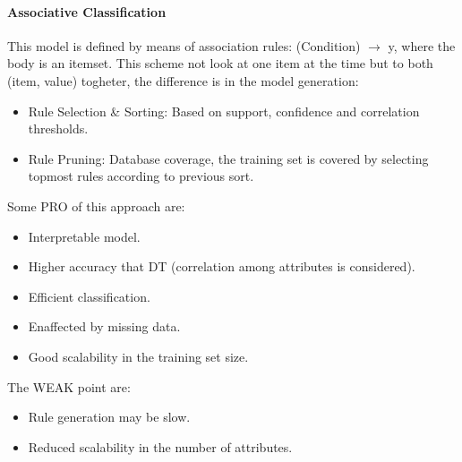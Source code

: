 \documentclass[12pt]{article}
\begin{document}
\paragraph{Associative Classification} This model is defined by means of association rules: (Condition) $\rightarrow$ y, where the body is an itemset. This scheme not look at one item at the time but to both (item, value) togheter, the difference is in the model generation:
\begin{itemize}
  \item Rule Selection \& Sorting: Based on support, confidence and correlation thresholds.
  \item Rule Pruning: Database coverage, the training set is covered by selecting topmost rules according to previous sort.
\end{itemize}
Some PRO of this approach are:
\begin{itemize}
  \item Interpretable model.
  \item Higher accuracy that DT (correlation among attributes is considered).
  \item Efficient classification.
  \item Enaffected by missing data.
  \item Good scalability in the training set size.
\end{itemize}
The WEAK point are:
\begin{itemize}
  \item Rule generation may be slow.
  \item Reduced scalability in the number of attributes.
\end{itemize}
\end{document}
